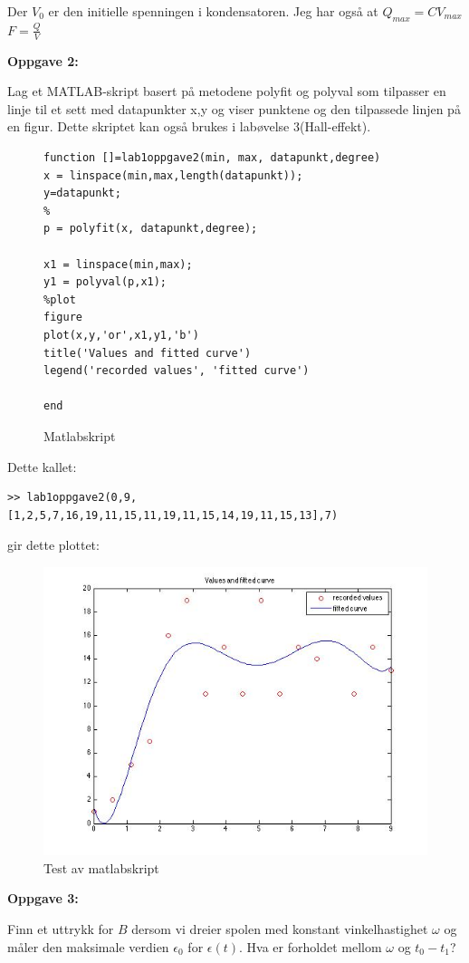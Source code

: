 \documentclass[12pt,a4paper,leqno]{report}
\begin{document}
Der $V_0$ er den initielle spenningen i kondensatoren.
Jeg har også at $Q_{max}=CV_{max}$
$F=\frac{Q}{V}$ 
\pagebreak


\textbf{Oppgave 2:} 

Lag et MATLAB-skript basert på metodene polyfit og polyval som tilpasser en linje til et sett med datapunkter x,y og viser punktene og den tilpassede linjen på en figur. Dette skriptet kan også brukes i labøvelse 3(Hall-effekt).

\begin{figure}
\caption{Matlabskript}
\begin{verbatim}
function []=lab1oppgave2(min, max, datapunkt,degree)
x = linspace(min,max,length(datapunkt));
y=datapunkt;
%
p = polyfit(x, datapunkt,degree);

x1 = linspace(min,max);
y1 = polyval(p,x1);
%plot
figure
plot(x,y,'or',x1,y1,'b')
title('Values and fitted curve')
legend('recorded values', 'fitted curve')

end
\end{verbatim}
\end{figure}
Dette kallet: 
\begin{verbatim}
>> lab1oppgave2(0,9,[1,2,5,7,16,19,11,15,11,19,11,15,14,19,11,15,13],7)
\end{verbatim}
gir dette plottet:
\begin{figure}[H]
\caption{Test av matlabskript}
\centering
\includegraphics[width=\textwidth]{curvefittertest.jpg}
\end{figure}


\textbf{Oppgave 3:} 

 Finn et uttrykk for $B$ dersom vi dreier spolen med konstant vinkelhastighet $\omega$ og måler den maksimale verdien $\epsilon_0$ for $\epsilon(t)$. Hva er forholdet mellom 
$\omega$ og $t_0-t_1$?
\end{document}
